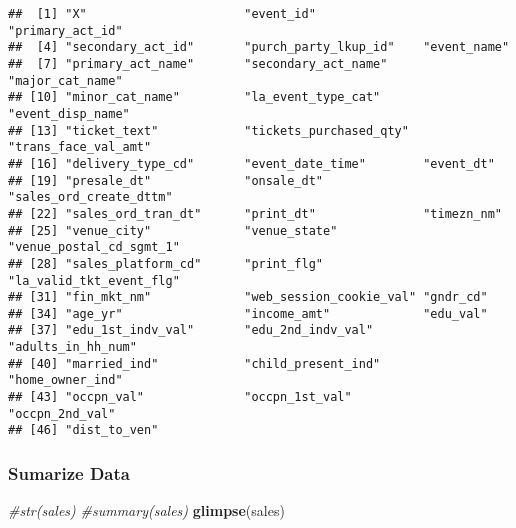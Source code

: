 \documentclass[]{article}
\newenvironment{Shaded}{\begin{snugshade}}{\end{snugshade}}
\newcommand{\CommentTok}[1]{\textcolor[rgb]{0.56,0.35,0.01}{\textit{#1}}}
\newcommand{\KeywordTok}[1]{\textcolor[rgb]{0.13,0.29,0.53}{\textbf{#1}}}
\newcommand{\NormalTok}[1]{#1}
\begin{document}
\begin{verbatim}
##  [1] "X"                      "event_id"               "primary_act_id"        
##  [4] "secondary_act_id"       "purch_party_lkup_id"    "event_name"            
##  [7] "primary_act_name"       "secondary_act_name"     "major_cat_name"        
## [10] "minor_cat_name"         "la_event_type_cat"      "event_disp_name"       
## [13] "ticket_text"            "tickets_purchased_qty"  "trans_face_val_amt"    
## [16] "delivery_type_cd"       "event_date_time"        "event_dt"              
## [19] "presale_dt"             "onsale_dt"              "sales_ord_create_dttm" 
## [22] "sales_ord_tran_dt"      "print_dt"               "timezn_nm"             
## [25] "venue_city"             "venue_state"            "venue_postal_cd_sgmt_1"
## [28] "sales_platform_cd"      "print_flg"              "la_valid_tkt_event_flg"
## [31] "fin_mkt_nm"             "web_session_cookie_val" "gndr_cd"               
## [34] "age_yr"                 "income_amt"             "edu_val"               
## [37] "edu_1st_indv_val"       "edu_2nd_indv_val"       "adults_in_hh_num"      
## [40] "married_ind"            "child_present_ind"      "home_owner_ind"        
## [43] "occpn_val"              "occpn_1st_val"          "occpn_2nd_val"         
## [46] "dist_to_ven"
\end{verbatim}

\hypertarget{sumarize-data}{%
\subsubsection{Sumarize Data}\label{sumarize-data}}

\begin{Shaded}
\begin{Highlighting}[]
\CommentTok{#str(sales)}
\CommentTok{#summary(sales)}
\KeywordTok{glimpse}\NormalTok{(sales)}
\end{Highlighting}
\end{Shaded}
\end{document}
